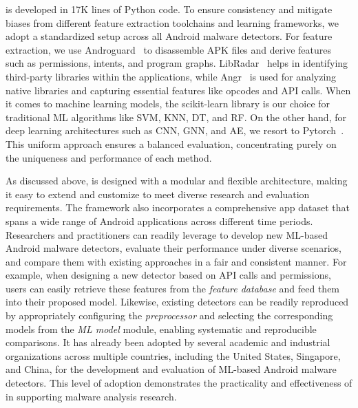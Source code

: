 \codename is developed in 17K lines of Python code.
To ensure consistency and mitigate biases from different feature extraction toolchains and learning frameworks, we adopt a standardized setup across all Android malware detectors.
For feature extraction, we use Androguard~\cite{androguard} to disassemble APK files and derive features such as permissions, intents, and program graphs. 
LibRadar~\cite{libradar} helps in identifying third-party libraries within the applications, while Angr~\cite{angr} is used for analyzing native libraries and capturing essential features like opcodes and API calls. 
When it comes to machine learning models, the scikit-learn library is our choice for traditional ML algorithms like SVM, KNN, DT, and RF.
On the other hand, for deep learning architectures such as CNN, GNN, and AE, we resort to Pytorch~\cite{pytorch}.
This uniform approach ensures a balanced evaluation, concentrating purely on the uniqueness and performance of each method.

As discussed above, \codename is designed with a modular and flexible architecture, making it easy to extend and customize to meet diverse research and evaluation requirements.
The framework also incorporates a comprehensive app dataset that spans a wide range of Android applications across different time periods.
Researchers and practitioners can readily leverage \codename to develop new ML-based Android malware detectors, evaluate their performance under diverse scenarios, and compare them with existing approaches in a fair and consistent manner.
For example, when designing a new detector based on API calls and permissions, users can easily retrieve these features from the \textit{feature database} and feed them into their proposed model.
Likewise, existing detectors can be readily reproduced by appropriately configuring the \textit{preprocessor} and selecting the corresponding models from the \textit{ML model} module, enabling systematic and reproducible comparisons.
It has already been adopted by several academic and industrial organizations across multiple countries, including the United States, Singapore, and China, for the development and evaluation of ML-based Android malware detectors.
This level of adoption demonstrates the practicality and effectiveness of \codename in supporting malware analysis research.

